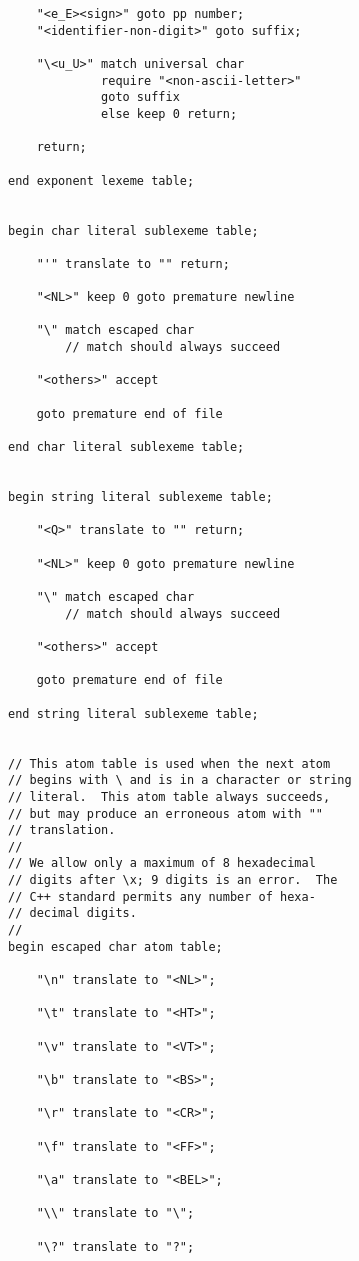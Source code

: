 \documentclass[12pt]{article}
\newenvironment{indpar}[1][0.3in]%
	{\begin{list}{}%
		     {\setlength{\itemsep}{0in}%
		      \setlength{\topsep}{0in}%
		      \setlength{\parsep}{1ex}%
		      \setlength{\labelwidth}{#1}%
		      \setlength{\leftmargin}{#1}%
		      \addtolength{\leftmargin}{\labelsep}}%
	 \item}%
	{\end{list}}
\begin{document}
\begin{indpar}
\begin{verbatim}
    "<e_E><sign>" goto pp number;
    "<identifier-non-digit>" goto suffix;

    "\<u_U>" match universal char
             require "<non-ascii-letter>"
             goto suffix
             else keep 0 return;

    return;

end exponent lexeme table;


begin char literal sublexeme table;

    "'" translate to "" return;

    "<NL>" keep 0 goto premature newline

    "\" match escaped char
        // match should always succeed

    "<others>" accept

    goto premature end of file

end char literal sublexeme table;


begin string literal sublexeme table;

    "<Q>" translate to "" return;

    "<NL>" keep 0 goto premature newline

    "\" match escaped char
        // match should always succeed

    "<others>" accept

    goto premature end of file

end string literal sublexeme table;


// This atom table is used when the next atom
// begins with \ and is in a character or string
// literal.  This atom table always succeeds,
// but may produce an erroneous atom with ""
// translation.
//
// We allow only a maximum of 8 hexadecimal
// digits after \x; 9 digits is an error.  The
// C++ standard permits any number of hexa-
// decimal digits.
//
begin escaped char atom table;

    "\n" translate to "<NL>";

    "\t" translate to "<HT>";

    "\v" translate to "<VT>";

    "\b" translate to "<BS>";

    "\r" translate to "<CR>";

    "\f" translate to "<FF>";

    "\a" translate to "<BEL>";

    "\\" translate to "\";

    "\?" translate to "?";


\end{verbatim}
\end{indpar}
\end{document}
